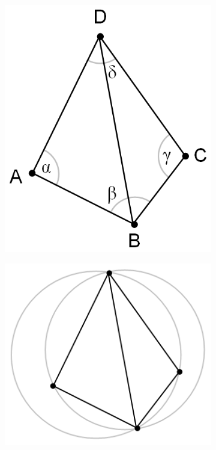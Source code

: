 \begin{figure}[H]
    \centering
    \begin{subfigure}[t]{0.2\textwidth}
        \includegraphics[width=\textwidth]{dados/figuras/delaunay_theorem1.png}
        \caption{}
        \label{fig:delaunay_theorem1}
    \end{subfigure}
    \hspace{2em}
    \begin{subfigure}[t]{0.27\textwidth}
        \includegraphics[width=\textwidth]{dados/figuras/delaunay_theorem2.png}

\end{subfigure}
\end{figure}
